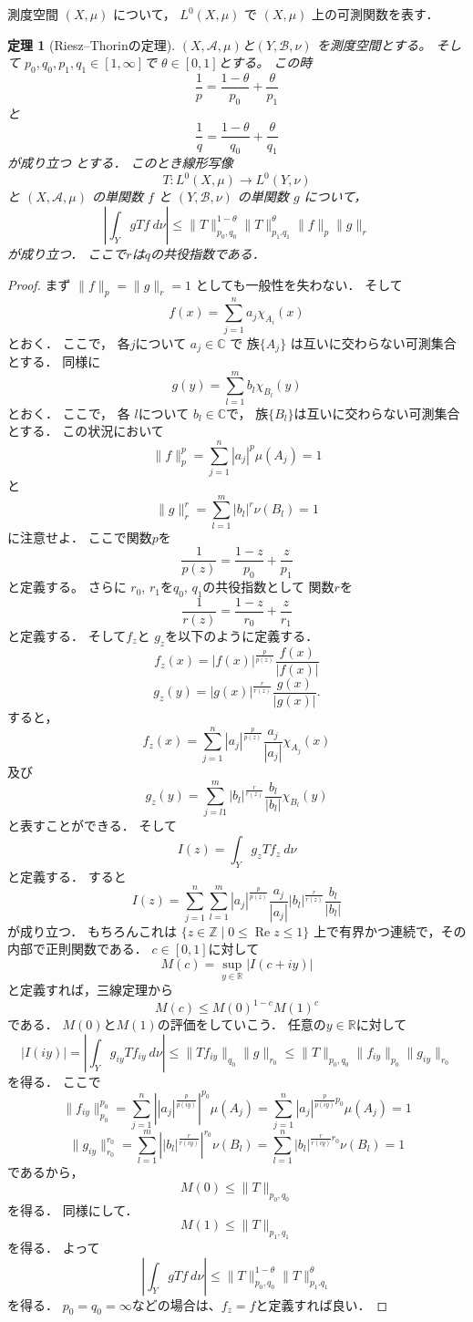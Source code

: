 \documentclass[leqno]{jsarticle}
\newtheorem{thm}{定理}
\newcommand{\zz}{\mathbb{Z}}
\newcommand{\rr}{\mathbb{R}}
\newcommand{\cc}{\mathbb{C}}
\DeclareMathOperator{\re}{Re}
\begin{document}
測度空間
$(X, \mu)$
について，
$L^0(X, \mu)$
で
$(X, \mu)$
上の可測関数を表す．
\begin{thm}[Riesz--Thorinの定理]
$(X,\mathcal{A},\mu)$と$(Y,\mathcal{B}, \nu)$
を測度空間とする。
そして
$p_{0}, q_{0}, p_{1},q_{1} \in [1,\infty] $で
$\theta\in [0,1]$とする。
この時
\[
\frac{1}{p}=\frac{1-\theta}{p_0}+\frac{\theta}{p_1}
\]
と
\[
\frac{1}{q}=\frac{1-\theta}{q_0}+\frac{\theta}{q_1}
\]
が成り立つ
とする．
このとき線形写像
\[
T\colon L^0(X,\mu)\to L^0(Y,\nu)
\]
と
$(X,\mathcal{A}, \mu)$
の単関数
$f$
と
$(Y,\mathcal{B}, \nu)$
の単関数
$g$
について，
\[
\left|\int_{Y}gTf\ d\nu \right|
\le \|T\|_{p_0, q_0}^{1-\theta}\|T\|_{p_1.q_1}^{\theta}\|f\|_p\|g\|_r
\]
が成り立つ．
ここで$r$は$q$の共役指数である．
\end{thm}
\begin{proof}
まず
$\|f\|_p=\|g\|_r=1$
としても一般性を失わない．
そして
\[
f(x)=\sum_{j=1}^na_j\chi_{A_i}(x)
\]
とおく．
ここで，
各$j$について
$a_j\in \cc$
で
族$\{A_{j}\}$
は互いに交わらない可測集合とする．
同様に
\[
g(y)=\sum_{l=1}^mb_l\chi_{B_l}(y)
\]
とおく．
ここで，
各
$l$について
$b_{l}\in \cc$で，
族$\{B_{l}\}$は互いに交わらない可測集合とする．
この状況において
\[
\|f\|_p^p=\sum_{j=1}^n|a_j|^p\mu(A_j)=1
\]
と
\[
\|g\|_r^r=\sum_{l=1}^m|b_l|^r\nu(B_l)=1
\]
に注意せよ．
ここで関数$p$を
\[
\frac{1}{p(z)}=\frac{1-z}{p_0}+\frac{z}{p_1}
\]
と定義する。
さらに
$r_0$, $r_1$を$q_0$, $q_1$の共役指数として
関数$r$を
\[
\frac{1}{r(z)}=\frac{1-z}{r_0}+\frac{z}{r_1}
\]
と定義する．
そして$f_{z}$と
$g_{z}$を以下のように定義する．
\[
f_z(x)=|f(x)|^{\frac{p}{p(z)}}\frac{f(x)}{|f(x)|}
\]
\[
g_z(y)=|g(x)|^{\frac{r}{r(z)}}\frac{g(x)}{|g(x)|}. 
\]
すると，
\[
f_z(x)=\sum_{j=1}^n|a_j|^{\frac{p}{p(z)}}\frac{a_j}{|a_j|}\chi_{A_j}(x)
\]
及び
\[
g_z(y)=\sum_{j=l1}^m|b_l|^{\frac{r}{r(z)}}\frac{b_l}{|b_l|}\chi_{B_l}(y)
\]
と表すことができる．
そして
\[
I(z)=\int_{Y}g_zTf_z\ d\nu
\]
と定義する．
すると
\[
I(z)=\sum_{j=1}^n\sum_{l=1}^m|a_j|^{\frac{p}{p(z)}}\frac{a_j}{|a_j|}|b_l|^{\frac{r}{r(z)}}\frac{b_l}{|b_l|}
\]
が成り立つ．
もちろんこれは
$\{z\in \zz\mid 0\le \re z\le 1\}$
上で有界かつ連続で，その内部で正則関数である．
$c\in [0,1]$に対して
\[
M(c)=\sup_{y\in \rr}|I(c+iy)|
\]
と定義すれば，三線定理から
\[
M(c)\le M(0)^{1-c}M(1)^c
\]
である．
$M(0)$と$M(1)$の評価をしていこう．
任意の$y\in \rr$に対して
\[
|I(iy)|=\left|\int_Yg_{iy}Tf_{iy}\ d\nu\right|\le \|Tf_{iy}\|_{q_0}\|g\|_{r_0}
\le \|T\|_{p_0, q_0}\|f_{iy}\|_{p_0}\|g_{iy}\|_{r_0}
\]
を得る．
ここで
\[
\|f_{iy}\|_{p_0}^{p_0}=\sum_{j=1}^n\left||a_j|^{\frac{p}{p(iy)}}\right|^{p_0}\mu(A_j)=\sum_{j=1}^n|a_j|^{\frac{p}{p(iy)}p_0}\mu(A_j)=1
\]
\[
\|g_{iy}\|_{r_0}^{r_0}=\sum_{l=1}^m\left||b_l|^{\frac{r}{r(iy)}}\right|^{r_0}\nu(B_l)=\sum_{l=1}^n|b_l|^{\frac{r}{r(iy)}r_0}\nu(B_l)=1
\]
であるから，
\[
M(0)\le \|T\|_{p_0,q_0}
\]
を得る．
同様にして．
\[
M(1)\le \|T\|_{p_1, q_1}
\]
を得る．
よって
\[
\left|\int_{Y}gTf\ d\nu \right|
\le \|T\|_{p_0, q_0}^{1-\theta}\|T\|_{p_1.q_1}^{\theta}
\]
を得る．
$p_0=q_0=\infty$などの場合は、$f_z=f$と定義すれば良い．
\end{proof}
\end{document}
